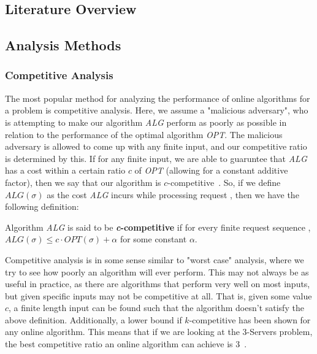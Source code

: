 \subsection{Literature Overview}
\label{sec:lit}


\subsection{Analysis Methods}
\label{sec:AM}

\subsubsection*{Competitive Analysis}
\label{sec:Comp}
The most popular method for analyzing the performance of online algorithms for a problem is competitive analysis. Here, we assume a "malicious adversary", who is attempting to make our algorithm \textit{ALG} perform as poorly as possible in relation to the performance of the optimal algorithm \textit{OPT}. The malicious adversary is allowed to come up with any finite input, and our competitive ratio is determined by this. If for any finite input, we are able to guaruntee that \textit{ALG} has a cost within a certain ratio $c$ of \textit{OPT} (allowing for a constant additive factor), then we say that our algorithm is $c$-competitive~\cite{OnlineComp1998}. So, if we define $ALG(\sigma)$ as the cost \textit{ALG} incurs while processing request \s, then we have the following definition: 

\begin{definition}
\label{def:comp}
Algorithm \textit{ALG} is said to be \textbf{\textit{c}-competitive} if for every finite request sequence \s, $ALG(\sigma) \leq c\cdot OPT(\sigma)+\alpha$ for some constant $\alpha$.
\end{definition}

Competitive analysis is in some sense similar to "worst case" analysis, where we try to see how poorly an algorithm will ever perform. This may not always be as useful in practice, as there are algorithms that perform very well on most inputs, but given specific inputs may not be competitive at all. That is, given some value $c$, a finite length input can be found such that the algorithm doesn't satisfy the above definition. Additionally, a lower bound if $k$-competitive has been shown for any online algorithm. This means that if we are looking at the 3-Servers problem, the best competitive ratio an online algorithm can achieve is 3~\cite{OnlineComp1998}. 


